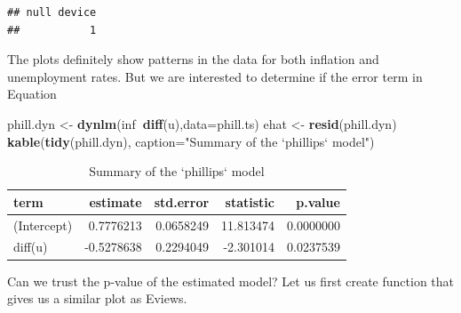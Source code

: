 \documentclass[]{book}
\newenvironment{Shaded}{\begin{snugshade}}{\end{snugshade}}
\newcommand{\DataTypeTok}[1]{\textcolor[rgb]{0.13,0.29,0.53}{#1}}
\newcommand{\KeywordTok}[1]{\textcolor[rgb]{0.13,0.29,0.53}{\textbf{#1}}}
\newcommand{\NormalTok}[1]{#1}
\newcommand{\OperatorTok}[1]{\textcolor[rgb]{0.81,0.36,0.00}{\textbf{#1}}}
\newcommand{\StringTok}[1]{\textcolor[rgb]{0.31,0.60,0.02}{#1}}
\begin{document}
\begin{verbatim}
## null device 
##           1
\end{verbatim}

The plots definitely show patterns in the data for both inflation and unemployment rates. But we are interested to determine if the error term in Equation

\begin{Shaded}
\begin{Highlighting}[]
\NormalTok{phill.dyn <-}\StringTok{ }\KeywordTok{dynlm}\NormalTok{(inf}\OperatorTok{~}\KeywordTok{diff}\NormalTok{(u),}\DataTypeTok{data=}\NormalTok{phill.ts)}
\NormalTok{ehat <-}\StringTok{ }\KeywordTok{resid}\NormalTok{(phill.dyn)}
\KeywordTok{kable}\NormalTok{(}\KeywordTok{tidy}\NormalTok{(phill.dyn), }\DataTypeTok{caption=}\StringTok{"Summary of the `phillips` model"}\NormalTok{)}
\end{Highlighting}
\end{Shaded}

\begin{table}[t]

\caption{\label{tab:unnamed-chunk-185}Summary of the `phillips` model}
\centering
\begin{tabular}{l|r|r|r|r}
\hline
term & estimate & std.error & statistic & p.value\\
\hline
(Intercept) & 0.7776213 & 0.0658249 & 11.813474 & 0.0000000\\
\hline
diff(u) & -0.5278638 & 0.2294049 & -2.301014 & 0.0237539\\
\hline
\end{tabular}
\end{table}

Can we trust the p-value of the estimated model? Let us first create function that gives us a similar plot as Eviews.
\end{document}
